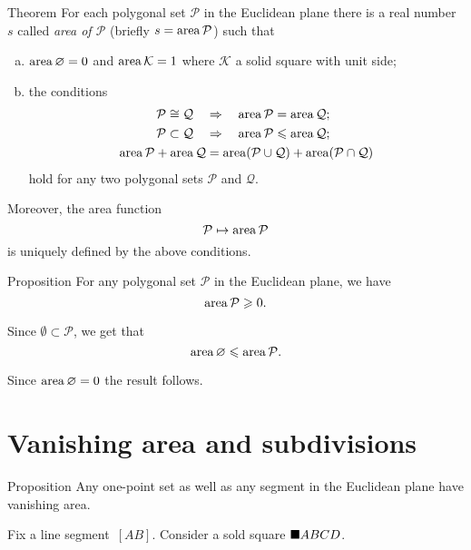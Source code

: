 \begin{thm}{Theorem}\label{thm:area}
For each polygonal set $\mathcal{P}$ in the Euclidean plane 
there is a real number $s$ 
called \emph{area of $\mathcal{P}$} 
(briefly $s=\mathop{\rm area}\nolimits \mathcal{P}$) such that 
\begin{enumerate}[(a)]
\item $\mathop{\rm area}\nolimits\varnothing=0$ and
$\mathop{\rm area}\nolimits\mathcal{K}=1$
where  $\mathcal{K}$ a solid square with unit side;

\item the conditions
\begin{align*}
\mathcal{P}\cong\mathcal{Q}
\quad 
&\Rightarrow
\quad \mathop{\rm area}\nolimits\mathcal{P}=\mathop{\rm area}\nolimits\mathcal{Q};
\\
\mathcal{P}\subset\mathcal{Q}
\quad
&\Rightarrow
\quad 
\mathop{\rm area}\nolimits\mathcal{P}\leqslant\mathop{\rm area}\nolimits\mathcal{Q};
\\
\mathop{\rm area}\nolimits\mathcal{P}+\mathop{\rm area}\nolimits\mathcal{Q}
&=
\mathop{\rm area}\nolimits(\mathcal{P}\cup\mathcal{Q})+\mathop{\rm area}\nolimits(\mathcal{P}\cap\mathcal{Q})
\end{align*}
hold 
for any two polygonal sets $\mathcal{P}$ and $\mathcal{Q}$.
\end{enumerate}


Moreover, the area function 
\[\mathcal{P}\mapsto \mathop{\rm area}\nolimits \mathcal{P}\]
is uniquely defined by the above conditions.
\end{thm}

\begin{thm}{Proposition}\label{prop:area-positive}
For any polygonal set $\mathcal{P}$ in the Euclidean plane, 
we have
\[\mathop{\rm area}\nolimits\mathcal{P}\geqslant 0.\]

\end{thm}

Since $\emptyset \subset \mathcal{P}$,
we get that
\[\mathop{\rm area}\nolimits\varnothing\leqslant \mathop{\rm area}\nolimits\mathcal{P}.\]

Since $\mathop{\rm area}\nolimits\varnothing=0$ the result follows.\qeds



\section*{Vanishing area and subdivisions}

\begin{thm}{Proposition}\label{prop:area-segment}
Any one-point set as well as any segment in the Euclidean plane have  vanishing area.
\end{thm}

Fix a line segment~$[AB]$.
Consider a sold square $\blacksquare ABCD$.

